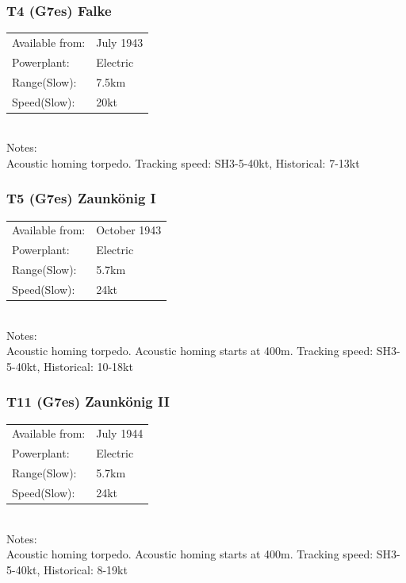 \documentclass{article}
\begin{document}
\subsubsection{T4 (G7es) Falke}
\begin{tabular}{l|l}
Available from:& July 1943\\
Powerplant:&Electric\\
Range(Slow):& 7.5km\\
Speed(Slow):& 20kt\\
\end{tabular} \\
Notes:\\
Acoustic homing torpedo. 
Tracking speed: SH3-5-40kt, Historical: 7-13kt

\subsubsection{T5 (G7es) Zaunk\"onig I}
\begin{tabular}{l|l}
Available from:& October 1943\\
Powerplant:&Electric\\
Range(Slow):& 5.7km\\
Speed(Slow):& 24kt\\
\end{tabular} \\
Notes:\\
Acoustic homing torpedo. 
Acoustic homing starts at 400m.
Tracking speed: SH3-5-40kt, Historical: 10-18kt

\subsubsection{T11 (G7es) Zaunk\"onig II}
\begin{tabular}{l|l}
Available from:& July 1944\\
Powerplant:&Electric\\
Range(Slow):& 5.7km\\
Speed(Slow):& 24kt\\
\end{tabular} \\
Notes:\\
Acoustic homing torpedo. 
Acoustic homing starts at 400m.
Tracking speed: SH3-5-40kt, Historical: 8-19kt


\end{document}

